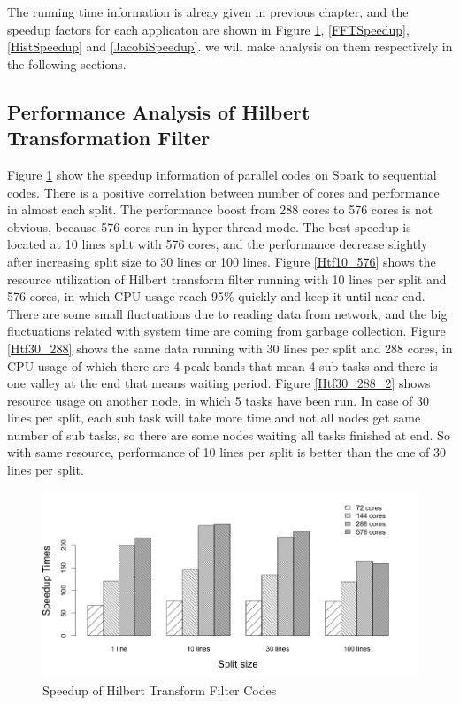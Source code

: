 The running time information is alreay given in previous chapter, and the speedup factors for each applicaton are shown in Figure \ref{HtfSpeedup}, \ref{FFTSpeedup}, \ref{HistSpeedup} and \ref{JacobiSpeedup}. we will make analysis on them respectively in the following sections. 

\subsection{Performance Analysis of Hilbert Transformation Filter}
Figure \ref{HtfSpeedup} show the speedup information of parallel codes on Spark to sequential codes. There is a positive correlation between number of cores and performance in almost each split. The performance boost from 288 cores to 576 cores is not obvious, because 576 cores run in hyper-thread mode. The best speedup is located at 10 lines split with 576 cores, and the performance decrease slightly after increasing split size to 30 lines or 100 lines. Figure \ref{Htf10_576} shows the resource utilization of Hilbert transform filter running with 10 lines per split and 576 cores, in which CPU usage reach 95\% quickly and keep it until near end. There are some small fluctuations due to reading data from network, and the big fluctuations related with system time are coming from garbage collection. Figure \ref{Htf30_288} shows the same data running with 30 lines per split and 288 cores, in CPU usage of which there are 4 peak bands that mean 4 sub tasks and there is one valley at the end that means waiting period. Figure \ref{Htf30_288_2} shows resource usage on another node, in which 5 tasks have been run. In case of 30 lines per split, each sub task will take more time and not all nodes get same number of sub tasks, so there are some nodes waiting all tasks finished at end. So with same resource, performance of 10 lines per split is better than the one of 30 lines per split. 

\begin{figure}[!ht]
\centering
\includegraphics[scale=.50]{figures/HtfSpeedup.png}
\caption{Speedup of Hilbert Transform Filter Codes}
\label{HtfSpeedup}
\end{figure}



